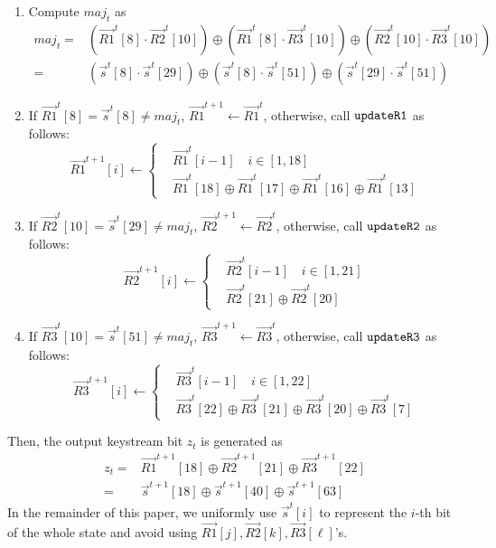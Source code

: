 \begin{enumerate}
  \item Compute $maj_t$ as
\begin{equation}\label{eq:Majt}
\begin{aligned}
  maj_t=&(\vec{R1}^t[8]\cdot \vec{R2}^t[10])\oplus (\vec{R1}^t[8]\cdot \vec{R3}^t[10])\oplus (\vec{R2}^t[10]\cdot \vec{R3}^t[10])\\
  =&(\vec{s}^t[8]\cdot \vec{s}^t[29])\oplus (\vec{s}^t[8]\cdot \vec{s}^t[51])\oplus (\vec{s}^t[29]\cdot \vec{s}^t[51])
\end{aligned}
\end{equation}
  \item If $\vec{R1}^t[8]=\vec{s}^t[8]\neq maj_t$, $\vec{R1}^{t+1}\leftarrow \vec{R1}^{t}$, otherwise, call $\tt{updateR1}$ as follows:
  \begin{equation}\label{eq:UpdateR1}
    \vec{R1}^{t+1}[i]\leftarrow\left\{
    \begin{aligned}
      &\vec{R1}^t[i-1]\quad i\in [1,18]\\
      &\vec{R1}^t[18]\oplus \vec{R1}^t[17]\oplus \vec{R1}^t[16]\oplus \vec{R1}^t[13]
    \end{aligned}
    \right.
  \end{equation}
  \item If $\vec{R2}^t[10]=\vec{s}^t[29]\neq maj_t$, $\vec{R2}^{t+1}\leftarrow \vec{R2}^t$, otherwise, call $\tt{updateR2}$ as follows:
    \begin{equation}\label{eq:UpdateR2}
    \vec{R2}^{t+1}[i]\leftarrow\left\{
    \begin{aligned}
      &\vec{R2}^t[i-1]\quad i\in [1,21]\\
      &\vec{R2}^t[21]\oplus \vec{R2}^t[20]
    \end{aligned}
    \right.
  \end{equation}
    \item If $\vec{R3}^t[10]=\vec{s}^t[51]\neq maj_t$, $\vec{R3}^{t+1}\leftarrow \vec{R3}^t$, otherwise, call $\tt{updateR3}$ as follows:
    \begin{equation}\label{eq:UpdateR3}
    \vec{R3}^{t+1}[i]\leftarrow\left\{
    \begin{aligned}
      &\vec{R3}^t[i-1]\quad i\in [1,22]\\
      &\vec{R3}^t[22]\oplus \vec{R3}^t[21]\oplus \vec{R3}^t[20]\oplus \vec{R3}^t[7]
    \end{aligned}
    \right.
  \end{equation}
\end{enumerate}
Then, the output keystream bit $z_t$ is generated as
\begin{equation}\label{eq:OutputZ}
\begin{aligned}
  z_t=&\vec{R1}^{t+1}[18]\oplus \vec{R2}^{t+1}[21]\oplus \vec{R3}^{t+1}[22]\\
  =&\vec{s}^{t+1}[18]\oplus \vec{s}^{t+1}[40]\oplus \vec{s}^{t+1}[63]
\end{aligned}
\end{equation}
In the remainder of this paper, we uniformly use $\vec{s}^t[i]$ to represent the $i$-th bit of the whole state and avoid using $\vec{R1}[j],\vec{R2}[k],\vec{R3}[\ell]$'s.

